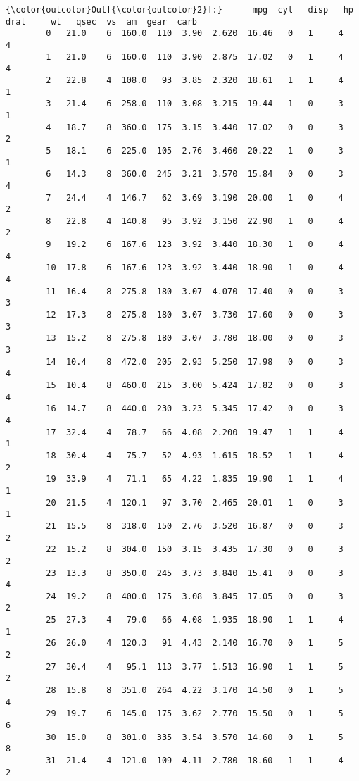 \documentclass[11pt]{article}
\begin{document}
\begin{Verbatim}[commandchars=\\\{\}]
{\color{outcolor}Out[{\color{outcolor}2}]:}      mpg  cyl   disp   hp  drat     wt   qsec  vs  am  gear  carb
        0   21.0    6  160.0  110  3.90  2.620  16.46   0   1     4     4
        1   21.0    6  160.0  110  3.90  2.875  17.02   0   1     4     4
        2   22.8    4  108.0   93  3.85  2.320  18.61   1   1     4     1
        3   21.4    6  258.0  110  3.08  3.215  19.44   1   0     3     1
        4   18.7    8  360.0  175  3.15  3.440  17.02   0   0     3     2
        5   18.1    6  225.0  105  2.76  3.460  20.22   1   0     3     1
        6   14.3    8  360.0  245  3.21  3.570  15.84   0   0     3     4
        7   24.4    4  146.7   62  3.69  3.190  20.00   1   0     4     2
        8   22.8    4  140.8   95  3.92  3.150  22.90   1   0     4     2
        9   19.2    6  167.6  123  3.92  3.440  18.30   1   0     4     4
        10  17.8    6  167.6  123  3.92  3.440  18.90   1   0     4     4
        11  16.4    8  275.8  180  3.07  4.070  17.40   0   0     3     3
        12  17.3    8  275.8  180  3.07  3.730  17.60   0   0     3     3
        13  15.2    8  275.8  180  3.07  3.780  18.00   0   0     3     3
        14  10.4    8  472.0  205  2.93  5.250  17.98   0   0     3     4
        15  10.4    8  460.0  215  3.00  5.424  17.82   0   0     3     4
        16  14.7    8  440.0  230  3.23  5.345  17.42   0   0     3     4
        17  32.4    4   78.7   66  4.08  2.200  19.47   1   1     4     1
        18  30.4    4   75.7   52  4.93  1.615  18.52   1   1     4     2
        19  33.9    4   71.1   65  4.22  1.835  19.90   1   1     4     1
        20  21.5    4  120.1   97  3.70  2.465  20.01   1   0     3     1
        21  15.5    8  318.0  150  2.76  3.520  16.87   0   0     3     2
        22  15.2    8  304.0  150  3.15  3.435  17.30   0   0     3     2
        23  13.3    8  350.0  245  3.73  3.840  15.41   0   0     3     4
        24  19.2    8  400.0  175  3.08  3.845  17.05   0   0     3     2
        25  27.3    4   79.0   66  4.08  1.935  18.90   1   1     4     1
        26  26.0    4  120.3   91  4.43  2.140  16.70   0   1     5     2
        27  30.4    4   95.1  113  3.77  1.513  16.90   1   1     5     2
        28  15.8    8  351.0  264  4.22  3.170  14.50   0   1     5     4
        29  19.7    6  145.0  175  3.62  2.770  15.50   0   1     5     6
        30  15.0    8  301.0  335  3.54  3.570  14.60   0   1     5     8
        31  21.4    4  121.0  109  4.11  2.780  18.60   1   1     4     2
\end{Verbatim}
            
\end{document}
